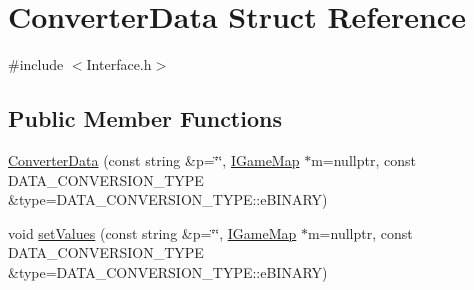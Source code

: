 \hypertarget{struct_converter_data}{}\section{Converter\+Data Struct Reference}
\label{struct_converter_data}


{\ttfamily \#include $<$Interface.\+h$>$}

\subsection*{Public Member Functions}
\begin{DoxyCompactItemize}
\item 
\hyperlink{struct_converter_data_a211499bf857868ac838af4848d8f509d}{Converter\+Data} (const string \&p=\char`\"{}\char`\"{}, \hyperlink{class_i_game_map}{I\+Game\+Map} $\ast$m=nullptr, const D\+A\+T\+A\+\_\+\+C\+O\+N\+V\+E\+R\+S\+I\+O\+N\+\_\+\+T\+Y\+P\+E \&type=D\+A\+T\+A\+\_\+\+C\+O\+N\+V\+E\+R\+S\+I\+O\+N\+\_\+\+T\+Y\+P\+E\+::e\+B\+I\+N\+A\+R\+Y)
\item 
void \hyperlink{struct_converter_data_aa8a3c2c84998a0f231ab15269c725caf}{set\+Values} (const string \&p=\char`\"{}\char`\"{}, \hyperlink{class_i_game_map}{I\+Game\+Map} $\ast$m=nullptr, const D\+A\+T\+A\+\_\+\+C\+O\+N\+V\+E\+R\+S\+I\+O\+N\+\_\+\+T\+Y\+P\+E \&type=D\+A\+T\+A\+\_\+\+C\+O\+N\+V\+E\+R\+S\+I\+O\+N\+\_\+\+T\+Y\+P\+E\+::e\+B\+I\+N\+A\+R\+Y)
\end{DoxyCompactItemize}
